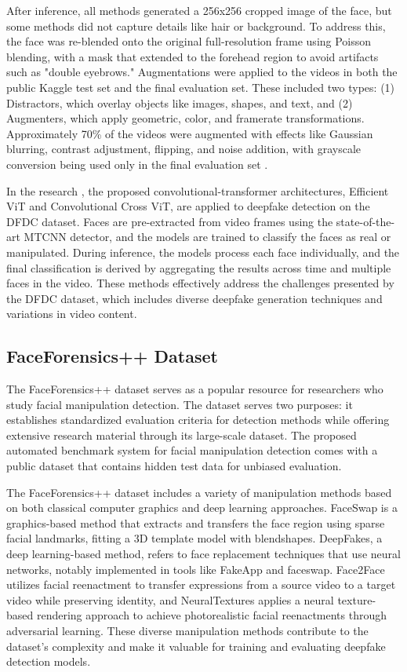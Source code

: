\documentclass{article} %
\begin{document}
After inference, all methods generated a 256x256 cropped image of the face, but some methods did not capture details like hair or background. To address this, the face was re-blended onto the original full-resolution frame using Poisson blending, with a mask that extended to the forehead region to avoid artifacts such as "double eyebrows." Augmentations were applied to the videos in both the public Kaggle test set and the final evaluation set. These included two types: (1) Distractors, which overlay objects like images, shapes, and text, and (2) Augmenters, which apply geometric, color, and framerate transformations. Approximately 70\% of the videos were augmented with effects like Gaussian blurring, contrast adjustment, flipping, and noise addition, with grayscale conversion being used only in the final evaluation set \cite{dolhansky2020deepfakedetectionchallengedfdc}.

In the research \cite{Coccomini_2022}, the proposed convolutional-transformer architectures, Efficient ViT and Convolutional Cross ViT, are applied to deepfake detection on the DFDC dataset. Faces are pre-extracted from video frames using the state-of-the-art MTCNN detector, and the models are trained to classify the faces as real or manipulated. During inference, the models process each face individually, and the final classification is derived by aggregating the results across time and multiple faces in the video. These methods effectively address the challenges presented by the DFDC dataset, which includes diverse deepfake generation techniques and variations in video content.

\subsection{FaceForensics++ Dataset}
The FaceForensics++ dataset serves as a popular resource for researchers who study facial manipulation detection. The dataset serves two purposes: it establishes standardized evaluation criteria for detection methods while offering extensive research material through its large-scale dataset. The proposed automated benchmark system for facial manipulation detection comes with a public dataset that contains hidden test data for unbiased evaluation\cite{Rossler_2019_ICCV}.

The FaceForensics++ dataset includes a variety of manipulation methods based on both classical computer graphics and deep learning approaches. FaceSwap is a graphics-based method that extracts and transfers the face region using sparse facial landmarks, fitting a 3D template model with blendshapes. DeepFakes, a deep learning-based method, refers to face replacement techniques that use neural networks, notably implemented in tools like FakeApp and faceswap. Face2Face utilizes facial reenactment to transfer expressions from a source video to a target video while preserving identity, and NeuralTextures applies a neural texture-based rendering approach to achieve photorealistic facial reenactments through adversarial learning. These diverse manipulation methods contribute to the dataset's complexity and make it valuable for training and evaluating deepfake detection models\cite{Rossler_2019_ICCV}.
\end{document}

